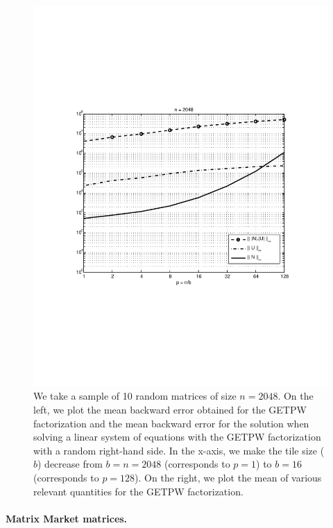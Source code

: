 \documentclass{article}
\begin{document}
\begin{figure}
\begin{minipage}{0.45 \textwidth}
\includegraphics[width=1.00 \textwidth]{images/results_random_nb_n2048_002_bw.pdf}
\end{minipage}
\caption{\label{fig:random_nb_n2048}
We take a sample of 10 random matrices of size $n=2048$.
On the left, we plot the mean backward error obtained for the GETPW factorization and
the mean backward error for the solution when solving a linear system of equations with the GETPW factorization
with a random right-hand side. In the x-axis, we make the tile size ($b$) decrease
from $b=n=2048$ (corresponds to $p=1$) to $b=16$ (corresponds to $p=128$).
On the right, we plot the mean of various relevant quantities for the GETPW factorization.
}
\end{figure}

\paragraph{Matrix Market matrices.}
\end{document}

